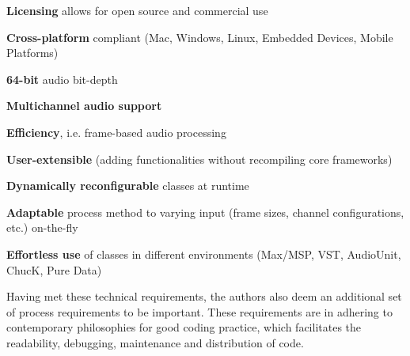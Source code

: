 \documentclass[twoside,10pt]{article}
\newenvironment{packed_item}{
\begin{itemize}
  \setlength{\itemsep}{1pt}
  \setlength{\parskip}{0pt}
  \setlength{\parsep}{0pt}
}{\end{itemize}}
\begin{document}
\begin{packed_item}%
  \item \textbf{Licensing} allows for open source and commercial use
	\item \textbf{Cross-platform} compliant (Mac, Windows, Linux, Embedded Devices, Mobile Platforms)	
	\item \textbf{64-bit} audio bit-depth
	\item \textbf{Multichannel audio support}
	\item \textbf{Efficiency}, i.e. frame-based audio processing
	\item \textbf{User-extensible} (adding functionalities without recompiling core frameworks)
	\item \textbf{Dynamically reconfigurable} classes at runtime %
	\item \textbf{Adaptable} process method to varying input (frame sizes, channel configurations, etc.) on-the-fly
	\item \textbf{Effortless use} of classes in different environments (Max/MSP, VST, AudioUnit, ChucK, Pure Data)
\end{packed_item}%


\noindent Having met these technical requirements, the authors also deem an additional set of process requirements to be important.  These requirements are in adhering to contemporary philosophies for good coding practice, 
which facilitates the readability, debugging, maintenance and distribution of code. 
\end{document}
